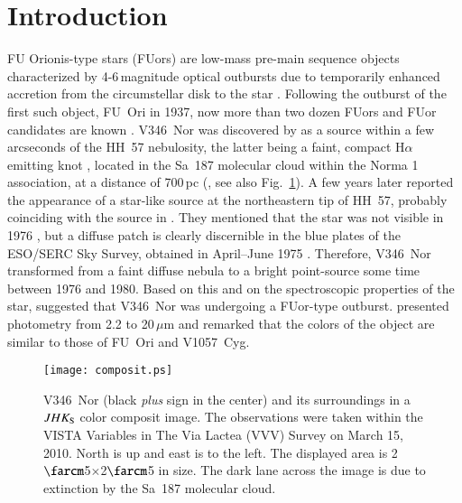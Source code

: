 \documentclass{aa}
\begin{document}

   \maketitle

\section{Introduction}

FU Orionis-type stars (FUors) are low-mass pre-main sequence objects
characterized by 4-6\,magnitude optical outbursts due to temporarily
enhanced accretion from the circumstellar disk to the star
\citep{hk96}. Following the outburst of the first such object, FU~Ori
in 1937, now more than two dozen FUors and FUor candidates are known
\citep{audard2014}. V346~Nor was discovered by \citet{elias1980} as a
source within a few arcseconds of the HH~57 nebulosity, the latter
being a faint, compact H$\alpha$ emitting knot \citep{schwartz1977},
located in the Sa~187 molecular cloud within the Norma 1 association,
at a distance of 700\,pc (\citealt{reipurth1981}, see also
Fig.~\ref{fig:composit}). A few years later \citet{graham1983}
reported the appearance of a star-like source at the northeastern tip
of HH~57, probably coinciding with the source in
\citet{elias1980}. They mentioned that the star was not visible in
1976 \citep{schwartz1977}, but a diffuse patch is clearly discernible
in the blue plates of the ESO/SERC Sky Survey, obtained in April--June
1975 \citep{holmberg1974,reipurth1981}. Therefore, V346~Nor
transformed from a faint diffuse nebula to a bright point-source some
time between 1976 and 1980. Based on this and on the spectroscopic
properties of the star, \citet{reipurth1983a} suggested that V346~Nor
was undergoing a FUor-type outburst. \citet{frogel1983} presented
photometry from 2.2 to 20$\,\mu$m and remarked that the colors of the
object are similar to those of FU~Ori and V1057~Cyg.

\begin{figure}
\centering \texttt{[image: composit.ps]}
\caption{V346~Nor (black {\it plus} sign in the center) and its
  surroundings in a $JHK_{\rm S}$ color composit image. The
  observations were taken within the VISTA Variables in The Via Lactea
  (VVV) Survey on March 15, 2010. North is up and east is to the
  left. The displayed area is 2$\farcm$5${\times}$2$\farcm$5 in
  size. The dark lane across the image is due to extinction by the
  Sa~187 molecular cloud.}
\label{fig:composit}
\end{figure}
\end{document}
